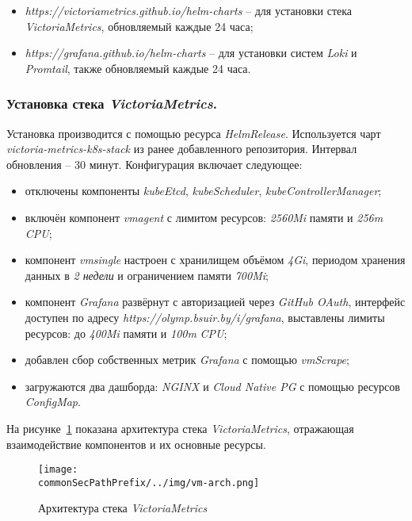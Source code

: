 \begin{itemize}
    \item \textit{https://victoriametrics.github.io/helm-charts} -- для установки стека \textit{VictoriaMetrics}, обновляемый каждые 24 часа;
    \item \textit{https://grafana.github.io/helm-charts} -- для установки систем \textit{Loki} и \textit{Promtail}, также обновляемый каждые 24 часа.
\end{itemize}

\subsubsection{Установка стека \textit{VictoriaMetrics}.} Установка производится с помощью ресурса \textit{HelmRelease}. Используется чарт \textit{victoria-metrics-k8s-stack} из ранее добавленного репозитория. Интервал обновления -- 30 минут. Конфигурация включает следующее:

\begin{itemize}
    \item отключены компоненты \textit{kubeEtcd}, \textit{kubeScheduler}, \textit{kubeControllerManager};
    \item включён компонент \textit{vmagent} с лимитом ресурсов: \textit{2560Mi} памяти и \textit{256m} \textit{CPU};
    \item компонент \textit{vmsingle} настроен с хранилищем объёмом \textit{4Gi}, периодом хранения данных в \textit{2 недели} и ограничением памяти \textit{700Mi};
    \item компонент \textit{Grafana} развёрнут с авторизацией через \textit{GitHub OAuth}, интерфейс доступен по адресу \textit{https://olymp.bsuir.by/i/grafana}, выставлены лимиты ресурсов: до \textit{400Mi} памяти и \textit{100m} \textit{CPU};
    \item добавлен сбор собственных метрик \textit{Grafana} с помощью \textit{vmScrape};
    \item загружаются два дашборда: \textit{NGINX} и \textit{Cloud Native PG} с помощью ресурсов \textit{ConfigMap}.
\end{itemize}

На рисунке~\ref{fig:vmstack-architecture} показана архитектура стека \textit{VictoriaMetrics}, отражающая взаимодействие компонентов и их основные ресурсы.

\begin{figure}[ht]
    \centering
    \texttt{[image: \\commonSecPathPrefix/../img/vm-arch.png]}
    \caption{Архитектура стека \textit{VictoriaMetrics}}
    \label{fig:vmstack-architecture}
\end{figure}

